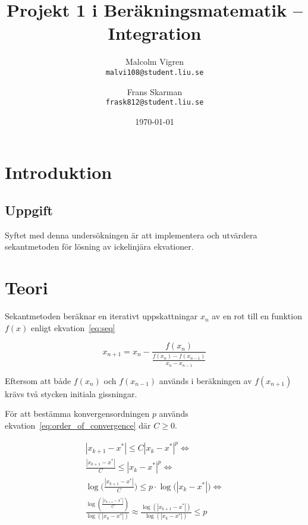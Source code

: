 \documentclass[a4paper,titlepage]{article}
\title{
    \textbf{Projekt 1 i Beräkningsmatematik -- Integration }}
\date{\today}
\author{%
    Malcolm Vigren \\
    \texttt{malvi108@student.liu.se}
    \and
    Frans Skarman\\
    \texttt{frask812@student.liu.se}
    }
\begin{document}
\maketitle
\newpage
\tableofcontents
\newpage

\section{Introduktion}

\subsection{Uppgift}

Syftet med denna undersökningen är att implementera och utvärdera sekantmetoden
för lösning av ickelinjära ekvationer.


\section{Teori}

Sekantmetoden beräknar en iterativt uppskattningar $x_n$ av en rot till en
funktion $f(x)$ enligt ekvation~\ref{eq:seq}

\begin{equation}
    \label{eq:seq}
    x_{n+1} = x_{n} -
    \frac{f(x_n)}
        {\frac{f(x_n) - f(x_{n-1})}
                {x_n - x_{n-1}}
        }
\end{equation}

Eftersom att både $f(x_n)$ och $f(x_{n-1})$ används i beräkningen av $f(x_{n+1})$ krävs
två stycken initiala gissningar.


För att bestämma konvergensordningen $p$ används ekvation~\ref{eq:order_of_convergence} där
$C \geq 0$.

\begin{equation}
    \begin{gathered}
        |x_{k+1} - x^*| \leq C |x_k - x^*|^p \Leftrightarrow \\
        \frac{|x_{k+1} - x^*|}{C} \leq |x_{k} - x^*|^p \Leftrightarrow \\
        \log\big(\frac{|x_{k+1} - x^*|}{C} \big) \leq
            p \cdot \log\big(|x_{k} - x^*|\big) \Leftrightarrow \\
        \frac{\log(\frac{|x_{k+1} - x^*|}{C})}
            {\log(|x_{k} - x^*|)}
        \approx \frac{\log(|x_{k+1} - x^*|)}
            {\log(|x_{k} - x^*|)} \leq p \\
    \end{gathered}
    \label{eq:order_of_convergence}
\end{equation}
\end{document}
